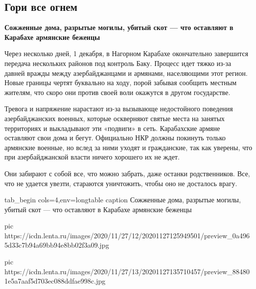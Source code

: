  
 
 
 
 
 
\subsection{Гори все огнем}
\label{sec:29_11_2020.news.ru.lenta_ru.1.gori_vse_ognem}


\begin{leftbar}
        \bfseries{\Large\color{red}
Сожженные дома, разрытые могилы, убитый скот — что оставляют в Карабахе армянские беженцы
        }
\end{leftbar}

Через несколько дней, 1 декабря, в Нагорном Карабахе окончательно завершится
передача нескольких районов под контроль Баку. Процесс идет тяжко из-за давней
вражды между азербайджанцами и армянами, населяющими этот регион. Новые границы
чертят буквально на ходу, порой забывая сообщить местным жителям, что скоро они
против своей воли окажутся в другом государстве.

Тревога и напряжение нарастают из-за вызывающе недостойного поведения
азербайджанских военных, которые оскверняют святые места на занятых территориях
и выкладывают эти «подвиги» в сеть. Карабахские армяне оставляют свои дома и
бегут. Официально НКР должны покинуть только армянские военные, но вслед за
ними уходят и гражданские, так как уверены, что при азербайджанской власти
ничего хорошего их не ждет.

Они забирают с собой все, что можно забрать, даже останки родственников. Все,
что не удается увезти, стараются уничтожить, чтобы оно не досталось врагу.

\ifcmt
tab_begin cols=4,env=longtable
  caption Сожженные дома, разрытые могилы, убитый скот — что оставляют в Карабахе армянские беженцы

pic https://icdn.lenta.ru/images/2020/11/27/12/20201127125949501/preview_0a4965d33c7b94a69bb94e8bb02f3a09.jpg

pic https://icdn.lenta.ru/images/2020/11/27/13/20201127135710457/preview_884801e5a7aaf5d703ec088ddfae998c.jpg

